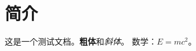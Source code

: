 \documentclass[fontset=fandol]{ctexart}
\begin{document}
\section{简介}
这是一个测试文档。\textbf{粗体}和\textit{斜体}。
数学：$E = mc^2$。
\end{document}
